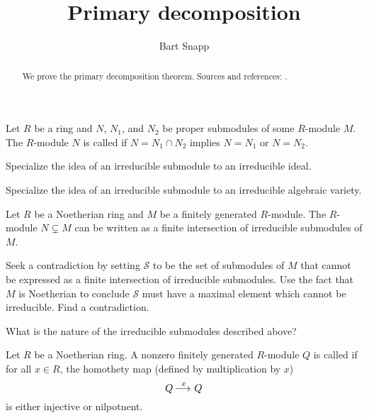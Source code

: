 \documentclass{ximera}
\author{Bart Snapp}
\title{Primary decomposition}
\begin{document}
\begin{abstract}
  We prove the primary decomposition theorem. Sources and references:
  \cite{AM1969, sD2008, dE1995, mR1995}.
\end{abstract}
\maketitle


\begin{definition}
  Let $R$ be a ring and $N$, $N_1$, and $N_2$ be proper submodules of
  some $R$-module $M$. The $R$-module $N$ is called 
  if $N = N_1\cap N_2$ implies $N=N_1$ or $N=N_2$.
\end{definition}


\begin{exercise}
  Specialize the idea of an irreducible submodule to an irreducible
  ideal.
\end{exercise}

\begin{exercise}
  Specialize the idea of an irreducible submodule to an irreducible
  algebraic variety.
\end{exercise}


\begin{lemma}\label{L:irrdecomp}
  Let $R$ be a Noetherian ring and $M$ be a finitely generated
  $R$-module. The $R$-module $N\subsetneq M$ can be written as a finite
  intersection of irreducible submodules of $M$.
  \begin{sketch}
    Seek a contradiction by setting $\mathcal{S}$ to be the set of
    submodules of $M$ that cannot be expressed as a finite
    intersection of irreducible submodules. Use the fact that $M$ is
    Noetherian to conclude $\mathcal{S}$ must have a maximal element
    which cannot be irreducible. Find a contradiction.
  \end{sketch}
\end{lemma}

\begin{question}
What is the nature of the irreducible submodules described above?
\end{question}


\begin{definition}
  Let $R$ be a Noetherian ring. A nonzero finitely generated
  $R$-module $Q$ is called  if for all $x\in R$, the
  homothety map (defined by multiplication by $x$)
  \[
  Q\mathop{\longrightarrow\,}\limits^x Q
  \]
  is either injective or nilpotnent.
\end{definition}
\end{document}
